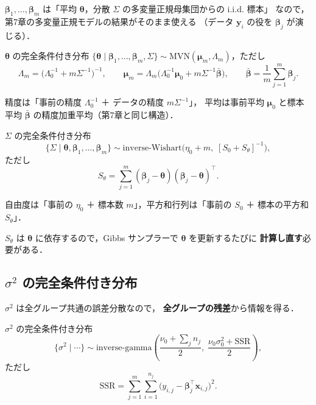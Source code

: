 \documentclass[lualatex,ja=standard,a4paper,12pt]{bxjsarticle}
\newcommand{\mvn}{\mathrm{MVN}}
\newcommand{\IW}{\mathrm{inverse\text{-}Wishart}}
\newcommand{\IG}{\mathrm{inverse\text{-}gamma}}
\begin{document}
$\bm{\beta}_1, \ldots, \bm{\beta}_m$ は「平均 $\bm{\theta}$，分散 $\Sigma$ の多変量正規母集団からの i.i.d. 標本」
なので，第7章の多変量正規モデルの結果がそのまま使える
（データ $\bm{y}_i$ の役を $\bm{\beta}_j$ が演じる）．

\begin{thmbox}{$\bm{\theta}$ の完全条件付き分布}
$\{\bm{\theta} \mid \bm{\beta}_1, \ldots, \bm{\beta}_m, \Sigma\} \sim \mvn(\bm{\mu}_m, \Lambda_m)$，ただし
\[
  \Lambda_m = \bigl(\Lambda_0^{-1} + m\Sigma^{-1}\bigr)^{-1}, \qquad
  \bm{\mu}_m = \Lambda_m\bigl(\Lambda_0^{-1}\bm{\mu}_0 + m\Sigma^{-1}\bar{\bm{\beta}}\bigr),
  \qquad \bar{\bm{\beta}} = \frac{1}{m}\sum_{j=1}^m \bm{\beta}_j.
\]
\end{thmbox}

\noindent 精度は「事前の精度 $\Lambda_0^{-1}$ ＋ データの精度 $m\Sigma^{-1}$」，
平均は事前平均 $\bm{\mu}_0$ と標本平均 $\bar{\bm{\beta}}$ の精度加重平均（第7章と同じ構造）．

\begin{thmbox}{$\Sigma$ の完全条件付き分布}
\[
  \{\Sigma \mid \bm{\theta}, \bm{\beta}_1, \ldots, \bm{\beta}_m\}
  \sim \IW\!\bigl(\eta_0 + m,\; [S_0 + S_\theta]^{-1}\bigr),
\]
ただし
\[
  S_\theta = \sum_{j=1}^m (\bm{\beta}_j - \bm{\theta})(\bm{\beta}_j - \bm{\theta})^\top.
\]
\end{thmbox}

\noindent 自由度は「事前の $\eta_0$ ＋ 標本数 $m$」，平方和行列は「事前の $S_0$ ＋ 標本の平方和 $S_\theta$」．

\begin{warningbox}
$S_\theta$ は $\bm{\theta}$ に依存するので，Gibbs サンプラーで $\bm{\theta}$ を更新するたびに
\textbf{計算し直す}必要がある．
\end{warningbox}

\subsection{$\sigma^2$ の完全条件付き分布}

$\sigma^2$ は全グループ共通の誤差分散なので，
\textbf{全グループの残差}から情報を得る．

\begin{thmbox}{$\sigma^2$ の完全条件付き分布}
\[
  \{\sigma^2 \mid \cdots\} \sim \IG\!\left(\frac{\nu_0 + \sum_j n_j}{2},\; \frac{\nu_0\sigma_0^2 + \mathrm{SSR}}{2}\right),
\]
ただし
\[
  \mathrm{SSR} = \sum_{j=1}^m \sum_{i=1}^{n_j} \bigl(y_{i,j} - \bm{\beta}_j^\top \bm{x}_{i,j}\bigr)^2.
\]
\end{thmbox}
\end{document}
